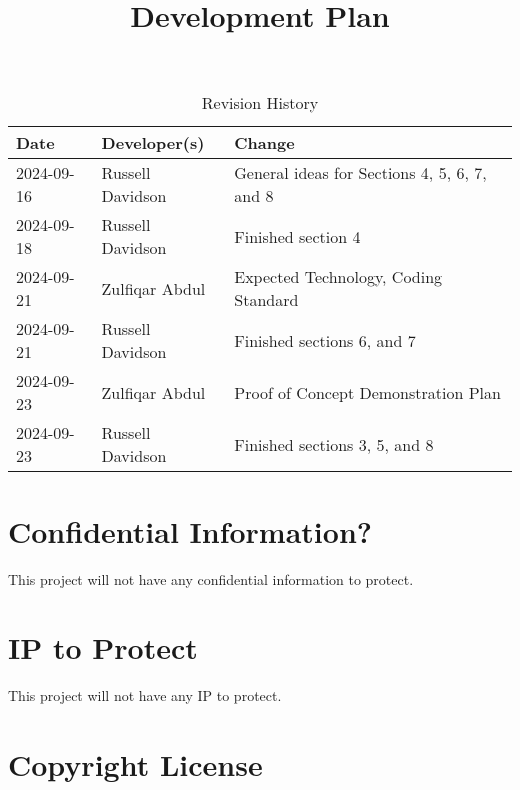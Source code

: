 \documentclass{article}
\title{Development Plan\\\progname}
\author{\authname}
\date{}
\begin{document}
\maketitle

\begin{table}[hp]
\caption{Revision History} \label{TblRevisionHistory}
\begin{tabularx}{\textwidth}{llX}
\toprule
\textbf{Date} & \textbf{Developer(s)} & \textbf{Change}\\
\midrule
2024-09-16 & Russell Davidson & General ideas for Sections 4, 5, 6, 7, and 8\\
2024-09-18 & Russell Davidson & Finished section 4\\
2024-09-21 & Zulfiqar Abdul & Expected Technology, Coding Standard\\
2024-09-21 & Russell Davidson & Finished sections 6, and 7\\
2024-09-23 & Zulfiqar Abdul & Proof of Concept Demonstration Plan\\
2024-09-23 & Russell Davidson & Finished sections 3, 5, and 8\\
\bottomrule
\end{tabularx}
\end{table}

\newpage{}



\section{Confidential Information?}

This project will not have any confidential information to protect.

\section{IP to Protect}

This project will not have any IP to protect.

\section{Copyright License}
\end{document}
